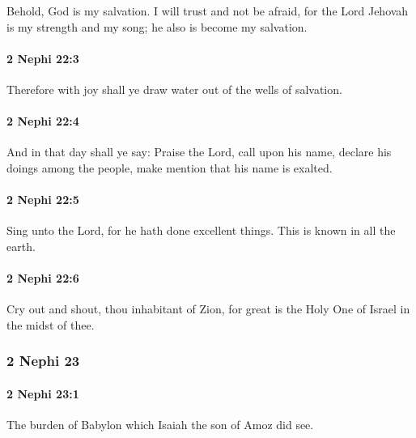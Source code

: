 			Behold, God is my salvation.
			I will trust and not be afraid,
			for the Lord Jehovah is my strength and my song;
			he also is become my salvation.

		\paragraph{2 Nephi 22:3} %
			\label{2NEPHI-22-3}

			Therefore with joy shall ye draw water out of the wells of salvation.	

		\paragraph{2 Nephi 22:4} %
			\label{2NEPHI-22-4}

			And in that day shall ye say:
			Praise the Lord,
			call upon his name,
			declare his doings among the people,
			make mention that his name is exalted.

		\paragraph{2 Nephi 22:5} %
			\label{2NEPHI-22-5}

			Sing unto the Lord,
			for he hath done excellent things.
			This is known in all the earth.

		\paragraph{2 Nephi 22:6} %
			\label{2NEPHI-22-6}

			Cry out and shout, thou inhabitant of Zion,
			for great is the Holy One of Israel in the midst of thee.

	\subsubsection{2 Nephi 23} %
		\label{2NEPHI-23}
		
		\paragraph{2 Nephi 23:1} %
			\label{2NEPHI-23-1}

			The burden of Babylon which Isaiah the son of Amoz did see.

